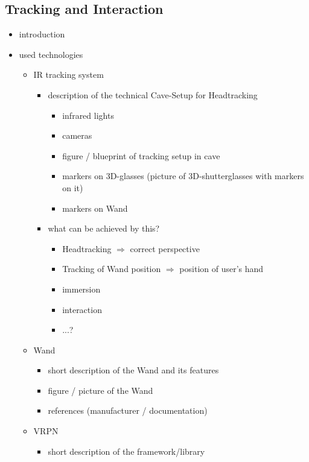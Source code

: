 \documentclass[conference]{acmsiggraph}
\begin{document}

\subsection{Tracking and Interaction}
\label{SEC:INTERACTION}

\begin{itemize}
\item introduction
\item{ used technologies
	\begin{itemize}
	\item{IR tracking system
		\begin{itemize}
		\item{description of the technical Cave-Setup for Headtracking
			\begin{itemize}
			\item infrared lights
			\item cameras
			\item figure / blueprint of tracking setup in cave
			\item markers on 3D-glasses (picture of 3D-shutterglasses with markers on it)
			\item markers on Wand
			\end{itemize}
		}
		\item{what can be achieved by this?
			\begin{itemize}
				\item Headtracking $\Rightarrow$ correct perspective
				\item Tracking of Wand position $\Rightarrow$ position of user's hand
				\item immersion
				\item interaction
				\item ...?
			\end{itemize}		
		}
		\end{itemize}
	}
	\item{Wand
		\begin{itemize}
		\item short description of the Wand and its features
		\item figure / picture of the Wand
		\item references (manufacturer / documentation)
		\end{itemize}
	}
	\item{VRPN
		\begin{itemize}
		\item short description of the framework/library

\end{itemize}}
\end{itemize}}
\end{itemize}
\end{document}
